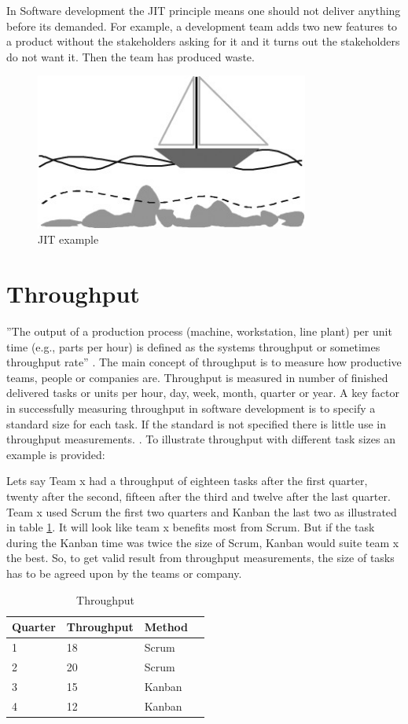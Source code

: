 \documentclass[UKenglish]{ifimaster}  %
\begin{document}
In Software development the JIT principle means one should not deliver anything before its demanded. For example, a development team adds two new features to a product without the stakeholders asking for it and it turns out the stakeholders do not want it. Then the team has produced waste. 
\begin{figure}[ht!]
\centering
\includegraphics[width=90mm]{Picture/JIT.jpg}
\caption{JIT example}
\label{JITE} %
\end{figure}

\section{Throughput}
''The output of a production process (machine, workstation, line plant) per unit time (e.g., parts per hour) is defined as the systems throughput or sometimes throughput rate'' \parencite{Adams}.
The main concept of throughput is to measure how productive teams, people or companies are. Throughput is measured in number of finished delivered tasks or units per hour, day, week, month, quarter or year. A key factor in successfully measuring throughput in software development is to specify a standard size for each task. If the standard is not specified there is little use in throughput measurements.  \parencite{Throughput}. To illustrate throughput with different task sizes an example is provided:  

Lets say Team x had a throughput of eighteen tasks after the first quarter, twenty after the second, fifteen after the third and twelve after the last quarter. Team x used Scrum the first two quarters and Kanban the last two as illustrated in table \ref{tt}. It will look like team x benefits most from Scrum. But if the task during the Kanban time was twice the size of Scrum, Kanban would suite team x the best. So, to get valid result from throughput measurements, the size of tasks has to be agreed upon by the teams or company.
\begin{table}[ht]
\begin{center}
    \begin{tabular}{| l | l | l | l |}
    \hline
    Quarter & Throughput & Method\\ \hline
    1 & 18 & Scrum\\ \hline
    2 & 20 & Scrum \\ \hline
    3 & 15 & Kanban\\ \hline
    4 & 12 & Kanban\\ \hline
    \end{tabular}
\caption{Throughput}
\label{tt} %
\end{center}
\end{table}
\end{document}
